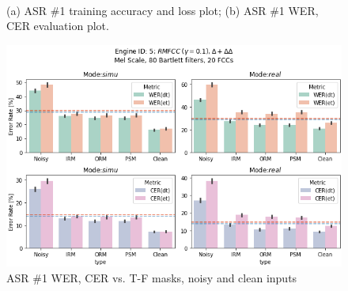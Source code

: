 \begin{figure}[H]
    \centering
    \\
    \vspace{-0.3cm}
    \caption{(a) ASR \#1 training accuracy and loss plot;\;\;
        (b) ASR \#1 WER, CER evaluation plot.}\label{fig:asr5_wer_subplot} 
\end{figure}

\begin{figure}[H]
    \centering
    \includegraphics[width=0.95\linewidth]{ASR/images/asr5_wer_masks.png}
    \caption{ASR \#1 WER, CER vs. T-F masks, noisy and clean inputs}\label{fig:asr5_wer_masks}
\end{figure}

